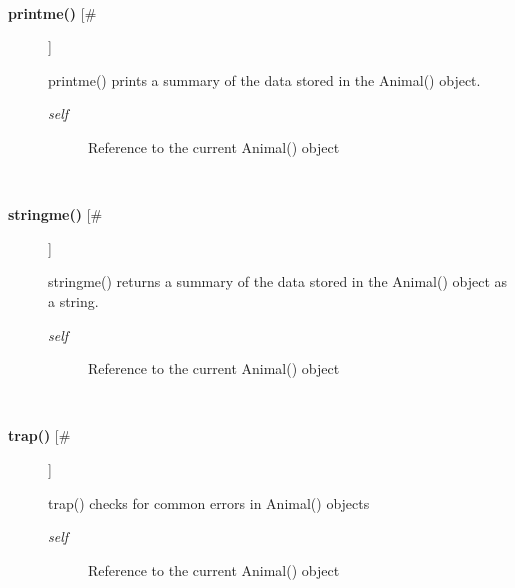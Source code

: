 \begin{description}
\begin{description}
\end{description}
\\ 

\item[\textbf{printme()}
 [\#]]

 printme() prints a summary of the data stored in the Animal() object.
\begin{description}
\item[\emph{self}
] Reference to the current Animal() object

\end{description}
\\ 

\item[\textbf{stringme()}
 [\#]]

 stringme() returns a summary of the data stored in the Animal() object as a string.
\begin{description}
\item[\emph{self}
] Reference to the current Animal() object

\end{description}
\\ 

\item[\textbf{trap()}
 [\#]]

 trap() checks for common errors in Animal() objects
\begin{description}
\item[\emph{self}
] Reference to the current Animal() object

\end{description}
\\ 


\end{description}

